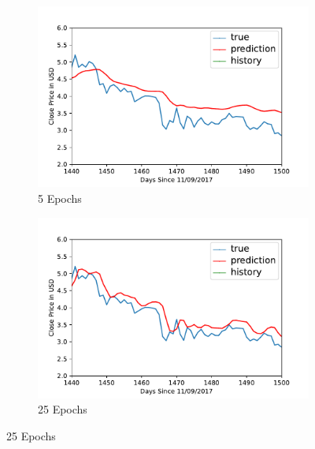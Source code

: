 

\begin{figure}[htb]
\centering
     \begin{subfigure}[b]{0.49\textwidth}
         \centering
         \includegraphics[width=\textwidth]{images/EOS-USD-epoch-5.pdf}
         \caption{5 Epochs}
         \label{fig:epochs-5}
     \end{subfigure}
     \hfill
    \begin{subfigure}[b]{0.49\textwidth}
         \centering
         \includegraphics[width=\textwidth]{images/EOS-USD-epoch-25.pdf}
         \caption{25 Epochs}

\end{subfigure}
\end{figure}
